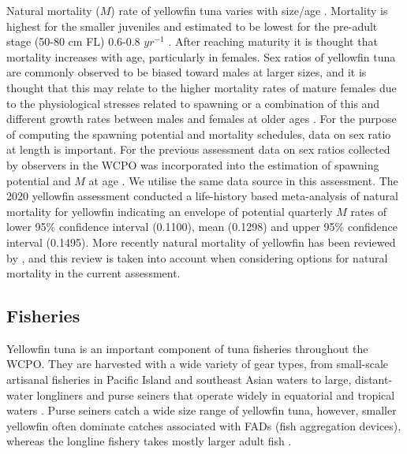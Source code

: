 Natural mortality ($M$) rate of yellowfin tuna varies with size/age \citep{hampton_natural_2000}. Mortality is highest for the smaller juveniles and estimated to be lowest for the pre-adult stage (50-80 cm FL) 0.6-0.8 $yr^{-1}$ \citep{hampton_natural_2000}. After reaching maturity it is thought that mortality increases with age, particularly in females. Sex ratios of yellowfin tuna are commonly observed to be biased toward males at larger sizes, and it is thought that this may relate to the higher mortality rates of mature females due to the physiological stresses related to spawning or a combination of this and different growth rates between males and females at older ages \citep{schaefer_mb_synopsis_1963,hampton_natural_2000,fonteneau_estimated_2002,sun_reproductive_2006,zhu_reproductive_2008}. For the purpose of computing the spawning potential and mortality schedules, data on sex ratio at length is important. For the previous assessment data on sex ratios collected by observers in the WCPO was incorporated into the estimation of spawning potential and $M$ at age \citep{vincent_background_2020}. We utilise the same data source in this assessment. The 2020 yellowfin assessment conducted a life-history based meta-analysis of natural mortality for yellowfin \citep{vincent_background_2020} indicating an envelope of potential quarterly $M$ rates of lower 95\% confidence interval (0.1100), mean (0.1298) and upper 95\% confidence interval (0.1495). More recently natural mortality of yellowfin has been reviewed by \citet{hoyle_approaches_2023}, and this review is taken into account when considering options for natural mortality in the current assessment.

\subsection{Fisheries}
\label{sec:fisheries}

Yellowfin tuna is an important component of tuna fisheries throughout the WCPO. They are harvested with a wide variety of gear types, from small-scale artisanal fisheries in Pacific Island and southeast Asian waters to large, distant-water longliners and purse seiners that operate widely in equatorial and tropical waters \citep{williams_overview_2023}. Purse seiners catch a wide size range of yellowfin tuna, however, smaller yellowfin often dominate catches associated with FADs (fish aggregation devices), whereas the longline fishery takes mostly larger adult fish \citep{vidal_developing_2020, williams_overview_2023}.

